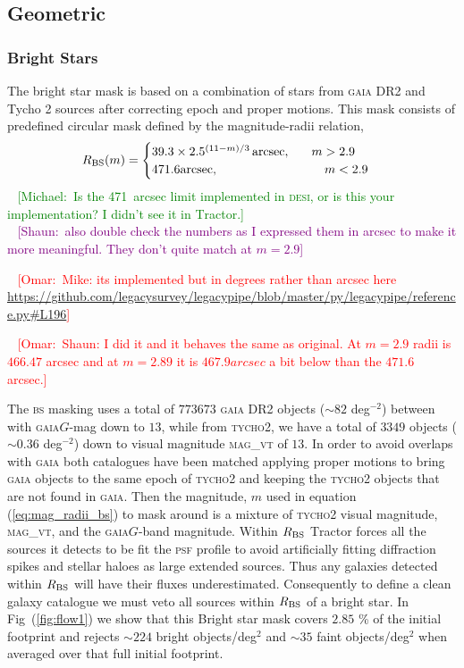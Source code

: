 \documentclass[fleqn,usenatbib]{mnras}
\newcommand{\mike}[1]{~\newline\noindent \textcolor{Green}{{ [Michael:~{#1}]\\}}}
\newcommand{\shaun}[1]{~\newline\noindent \textcolor{Purple}{{ [Shaun:~{#1}]\\}}}
\newcommand{\omar}[1]{~\newline\noindent \textcolor{red}{{ [Omar:~{#1}]\\}}}
\newcommand{\BS}{\textsc{bs}\xspace}
\newcommand{\DESI}{\textsc{desi}\xspace}
\newcommand{\GAIA}{\textsc{gaia}\xspace}
\newcommand{\PSF}{\textsc{psf}\xspace}
\newcommand{\TRACTOR}{\textsc{T}ractor\xspace}
\newcommand{\Tycho}{\textsc{tycho2}\xspace}
\begin{document}
\subsection{Geometric}\label{subsec:geometric}
\subsubsection{Bright Stars}

The bright star mask is based on a combination of stars from \GAIA DR2 \citep{2018A&A...616A...1G} and Tycho 2 \citep{2000A&A...355L..27H} sources after correcting epoch and proper motions. This mask consists of predefined circular mask defined by the magnitude-radii relation,
\begin{equation}
\label{eq:mag_radii_bs}
  R_{\rm BS}(m) =
\begin{cases}
  39.3 \times 2.5^{(11 - m)/3}\, {\rm arcsec}, \hspace{0.6cm} m > 2.9 \\
   471.6 {\rm arcsec}, \hspace{3cm} m < 2.9
\end{cases}
\end{equation}
\mike{Is the 471~arcsec limit implemented in \DESI, or is this your implementation?  I didn't see it in \TRACTOR.}
\shaun{also double check the numbers as I expressed them in arcsec to make it more meaningful. They don't quite match at $m=2.9$}

\omar{Mike: its implemented but in degrees rather than arcsec here \url{https://github.com/legacysurvey/legacypipe/blob/master/py/legacypipe/reference.py\#L196}}

\omar{Shaun: I did it and it behaves the same as original. At $m=2.9$ radii is $466.47$ arcsec and at $m=2.89$ it is $467.9 arcsec$ a bit below than the $471.6$ arcsec.}

The \BS masking uses a total of $773673$ \GAIA DR2 objects ($\sim 82$ deg$^{-2}$) between with \GAIA $G$-mag down to $13$, while from \Tycho, we have a total of $3349$ objects ($\sim 0.36$ deg$^{-2}$) down to visual magnitude  \textsc{mag}\_\textsc{vt} of $13$. In order to avoid overlaps with \GAIA both catalogues have been matched applying proper motions to bring \GAIA objects to the same epoch of \Tycho and keeping the \Tycho objects that are not found in \GAIA. Then the magnitude, $m$ used in equation (\ref{eq:mag_radii_bs}) to mask around is a mixture of \Tycho visual magnitude, \textsc{mag}\_\textsc{vt}, and the \GAIA $G$-band magnitude. Within $R_{\rm BS}$ \TRACTOR forces all the sources it detects to be fit the \PSF profile to avoid artificially fitting diffraction spikes and stellar haloes as large extended sources. Thus any galaxies detected within $R_{\rm BS}$ will have their 
fluxes underestimated. Consequently to define a clean galaxy catalogue we must veto all sources within  $R_{\rm BS}$ of a bright star. In Fig~(\ref{fig:flow1}) we show that this Bright star mask covers $2.85$ \% of the initial footprint and rejects $\sim 224$ bright objects/deg$^{2}$ and $\sim 35$ faint objects/deg$^{2}$ when averaged over that full initial footprint.
\end{document}
